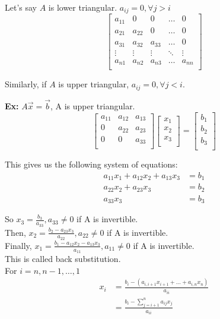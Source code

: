 \documentclass[12pt, letterpaper]{article}
\begin{document}
Let's say $A$ is lower triangular. $a_{ij} = 0, \forall j > i$ 
\[\begin{bmatrix}
    a_{11} & 0 & 0 & \ldots & 0 \\
    a_{21} & a_{22} & 0 & \ldots & 0 \\
    a_{31} & a_{32} & a_{33} & \ldots & 0 \\
    \vdots & \vdots & \vdots & \ddots & \vdots \\
    a_{n1} & a_{n2} & a_{n3} & \ldots & a_{nn} \\
\end{bmatrix}\]

Similarly, if $A$ is upper triangular, $a_{ij} = 0, \forall j < i$.

\noindent \textbf{Ex: } $A\vec{x} = \vec{b}$, A is upper triangular.
\[
\begin{bmatrix}
    a_{11} & a_{12} & a_{13} \\
    0 & a_{22} & a_{23} \\
    0 & 0 & a_{33} \\
\end{bmatrix}
\begin{bmatrix}
    x_1 \\
    x_2 \\
    x_3 \\
\end{bmatrix}
=
\begin{bmatrix}
    b_1 \\
    b_2 \\ 
    b_3 \\
\end{bmatrix}
\]

This gives us the following system of equations:
\begin{align*}
a_{11}x_1 + a_{12}x_2 + a_{13}x_3 &= b_1 \\
a_{22}x_2 + a_{23}x_3 &= b_2 \\
a_{33}x_3 &= b_3
\end{align*}

So $x_3=\frac{b_3}{a_{33}}, a_{33}\ne 0$ if A is invertible. \\

Then, $x_2 = \frac{b_2 - a_{23}x_3}{a_{22}}, a_{22}\ne 0$ if A is invertible. \\

Finally, $x_1 = \frac{b_1 - a_{12}x_2 - a_{13}x_3}{a_{11}}, a_{11}\ne 0$ if A is invertible. \\ 

\noindent This is called back substitution. \\
For $i = n,n-1,\ldots, 1$
\begin{align*}
x_i&=\frac{b_i-(a_{i,i+1}x_{i+1}+\ldots+a_{i,n}x_n)}{a_{ii}} \\
&= \frac{b_i - \sum_{j=i+1}^{n} a_{ij}x_j}{a_{ii}}
\end{align*}
\end{document}
